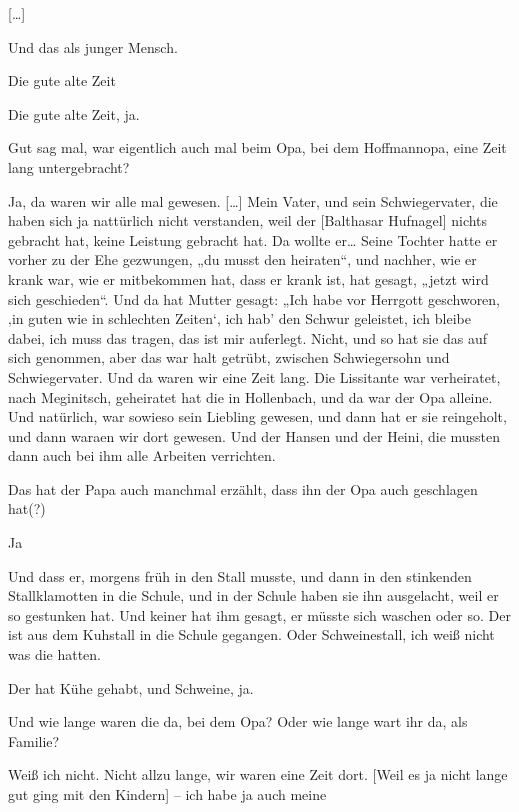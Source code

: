 \documentclass[ngerman,]{article}
\providecommand{\tightlist}{%
  \setlength{\itemsep}{0pt}\setlength{\parskip}{0pt}}
\begin{document}
\begin{multicols}{2}
{[}\ldots{}{]}

\begin{description}
\tightlist
\item[Käthe]
Und das als junger Mensch.
\item[Friedrich (ironisch)]
Die gute alte Zeit
\item[Käthe]
Die gute alte Zeit, ja.
\item[Ruth]
Gut sag mal, war eigentlich auch mal beim Opa, bei dem Hoffmannopa, eine
Zeit lang untergebracht?
\item[Käthe]
Ja, da waren wir alle mal gewesen. {[}\ldots{}{]} Mein Vater, und sein
Schwiegervater, die haben sich ja nattürlich nicht verstanden, weil der
{[}Balthasar Hufnagel{]} nichts gebracht hat, keine Leistung gebracht
hat. Da wollte er\ldots{} Seine Tochter hatte er vorher zu der Ehe
gezwungen, „du musst den heiraten“, und nachher, wie er krank war, wie
er mitbekommen hat, dass er krank ist, hat gesagt, „jetzt wird sich
geschieden“. Und da hat Mutter gesagt: „Ich habe vor Herrgott
geschworen, ‚in guten wie in schlechten Zeiten‘, ich hab' den Schwur
geleistet, ich bleibe dabei, ich muss das tragen, das ist mir auferlegt.
Nicht, und so hat sie das auf sich genommen, aber das war halt getrübt,
zwischen Schwiegersohn und Schwiegervater. Und da waren wir eine Zeit
lang. Die Lissitante war verheiratet, nach Meginitsch, geheiratet hat
die in Hollenbach, und da war der Opa alleine. Und natürlich, war
sowieso sein Liebling gewesen, und dann hat er sie reingeholt, und dann
waraen wir dort gewesen. Und der Hansen und der Heini, die mussten dann
auch bei ihm alle Arbeiten verrichten.
\item[Ruth]
Das hat der Papa auch manchmal erzählt, dass ihn der Opa auch geschlagen
hat(?)
\item[Käthe]
Ja
\item[Ruth]
Und dass er, morgens früh in den Stall musste, und dann in den
stinkenden Stallklamotten in die Schule, und in der Schule haben sie ihn
ausgelacht, weil er so gestunken hat. Und keiner hat ihm gesagt, er
müsste sich waschen oder so. Der ist aus dem Kuhstall in die Schule
gegangen. Oder Schweinestall, ich weiß nicht was die hatten.
\item[Käthe]
Der hat Kühe gehabt, und Schweine, ja.
\item[Ruth]
Und wie lange waren die da, bei dem Opa? Oder wie lange wart ihr da, als
Familie?
\item[Käthe]
Weiß ich nicht. Nicht allzu lange, wir waren eine Zeit dort. {[}Weil es
ja nicht lange gut ging mit den Kindern{]} – ich habe ja auch meine

\end{description}
\end{multicols}
\end{document}
